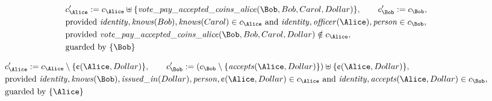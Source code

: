 \begin{align*}
&
c'_
{
\Alice
}
 := 
c_
{
\Alice
}
 \uplus 
\{
\mathit{\detokenize{
vote_pay_accepted_coins_alice
}}
(
\Bob
,
Bob
,
Carol
,
Dollar
)
\}
, \qquad 
c'_
{
\Bob
}
 := 
c_
{
\Bob
}
,\\
&
\text{provided } 
\mathit{\detokenize{
identity
}}
,
\mathit{\detokenize{
knows
}}
(
Bob
)
,
\mathit{\detokenize{
knows
}}
(
Carol
)
 \in c_
{
\Alice
}
 \text{ and } 
\mathit{\detokenize{
identity
}}
,
\mathit{\detokenize{
officer
}}
(
\Alice
)
,
\mathit{\detokenize{
person
}}
 \in c_
{
\Bob
}
,\\
&
\text{provided } 
\mathit{\detokenize{
vote_pay_accepted_coins_alice
}}
(
\Bob
,
Bob
,
Carol
,
Dollar
)
 \notin c_
{
\Alice
}
,\\
&
\text{guarded by } \{
\Bob
\}
\end{align*}

\begin{align*}
&
c'_
{
\Alice
}
 := 
c_
{
\Alice
}
 \setminus 
\{
\text{\textcent}
(
\Alice
,
Dollar
)
\}
, \qquad 
c'_
{
\Bob
}
 := 
(c_
{
\Bob
}
 \setminus 
\{
\mathit{\detokenize{
accepts
}}
(
\Alice
,
Dollar
)
\}
) \uplus 
\{
\text{\textcent}
(
\Alice
,
Dollar
)
\}
,\\
&
\text{provided } 
\mathit{\detokenize{
identity
}}
,
\mathit{\detokenize{
knows
}}
(
\Bob
)
,
\mathit{\detokenize{
issued_in
}}
(
Dollar
)
,
\mathit{\detokenize{
person
}}
,
\text{\textcent}
(
\Alice
,
Dollar
)
 \in c_
{
\Alice
}
 \text{ and } 
\mathit{\detokenize{
identity
}}
,
\mathit{\detokenize{
accepts
}}
(
\Alice
,
Dollar
)
 \in c_
{
\Bob
}
,\\
&
\text{guarded by } \{
\Alice
\}
\end{align*}

